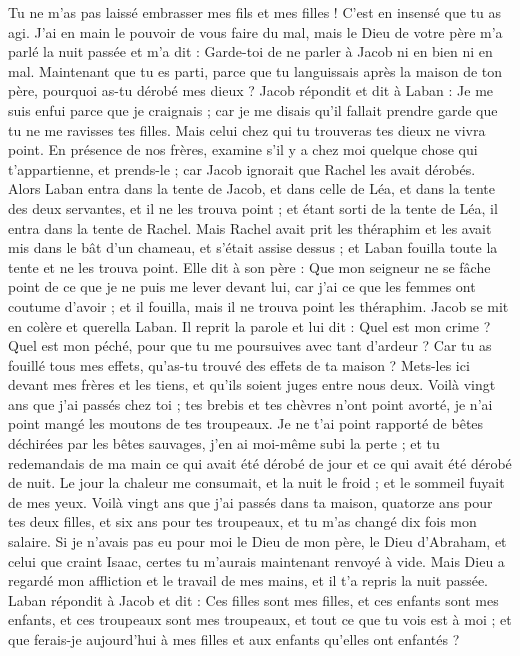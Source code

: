 \begin{multicols}{2}
Tu ne m'as pas laissé embrasser mes fils et mes filles ! C’est en insensé que tu as agi.
J'ai en main le pouvoir de vous faire du mal, mais le Dieu de votre père m'a parlé la nuit passée et m'a dit : Garde-toi de ne parler à Jacob ni en bien ni en mal.
Maintenant que tu es parti, parce que tu  languissais après la maison de ton père, pourquoi as-tu dérobé mes dieux ?
Jacob répondit et dit à Laban : Je me suis enfui parce que je craignais ; car je me disais qu'il fallait prendre garde que tu ne me ravisses tes filles.
Mais celui chez qui tu trouveras tes dieux ne vivra point. En présence de nos frères, examine  s'il y a chez moi quelque chose qui t'appartienne, et prends-le ; car Jacob ignorait que Rachel les avait dérobés.
Alors Laban entra dans la tente de Jacob, et dans celle de Léa, et dans la tente des deux servantes, et il ne les trouva point ; et étant sorti de la tente de Léa, il entra dans la tente de Rachel.
Mais Rachel avait prit les théraphim et les avait mis dans le bât d'un chameau, et s’était assise dessus ; et Laban fouilla toute la tente et ne les trouva point.
Elle dit à son père : Que mon seigneur ne se fâche point de ce que je ne puis me lever devant lui, car j'ai ce que les femmes ont coutume d'avoir ; et il fouilla, mais il ne trouva point les théraphim.
Jacob se mit en colère et querella Laban. Il reprit la parole et lui dit : Quel est mon crime ? Quel est mon péché, pour que tu me poursuives avec tant d’ardeur ?
Car tu as fouillé tous mes effets, qu'as-tu trouvé des effets de ta maison ? Mets-les ici devant mes frères et les tiens, et qu'ils soient juges entre nous deux.
Voilà vingt ans que j’ai passés chez toi ; tes brebis et tes chèvres n'ont point avorté, je n'ai point mangé les moutons de tes troupeaux.
Je ne t'ai point rapporté de bêtes déchirées par les bêtes sauvages, j'en ai moi-même subi la perte ; et tu redemandais de ma main ce qui avait été dérobé de jour et ce qui avait été dérobé de nuit.
Le jour la chaleur me consumait, et la nuit le froid ; et le sommeil fuyait de mes yeux.
Voilà vingt ans que j’ai passés dans ta maison, quatorze ans pour tes deux filles, et six ans pour tes troupeaux, et tu m'as changé dix fois mon salaire.
Si je n’avais pas eu pour moi le Dieu de mon père, le Dieu d'Abraham, et celui que craint Isaac, certes tu m’aurais maintenant renvoyé à vide. Mais Dieu a regardé mon affliction et le travail de mes mains, et il t'a repris la nuit passée.
Laban répondit à Jacob et dit : Ces filles sont mes filles, et ces enfants sont mes enfants, et ces troupeaux sont mes troupeaux, et tout ce que tu vois est à moi ; et que ferais-je aujourd'hui à mes filles et aux enfants qu'elles ont enfantés ?

\end{multicols}
